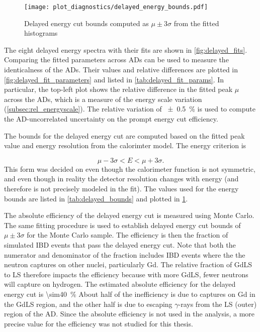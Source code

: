 \begin{figure}
    \centering
    \texttt{[image: plot\_diagnostics/delayed\_energy\_bounds.pdf]}
    \caption{
        Delayed energy cut bounds computed as $\mu\pm 3\sigma$
        from the fitted histograms
    }
    \label{fig:delayed_bounds}
\end{figure}

The eight delayed energy spectra with their fits are shown in \cref{fig:delayed_fits}.
Comparing the fitted parameters across ADs can be used
to measure the identicalness of the ADs.
Their values and relative differences are plotted in \cref{fig:delayed_fit_parameters}
and listed in \cref{tab:delayed_fit_params}.
In particular, the top-left plot shows the relative difference
in the fitted peak $\mu$ across the ADs,
which is a measure of the energy scale variation (\cref{subsec:rel_energyscale}).
The relative variation of \SI{+-0.5}{\percent}
is used to compute the AD-uncorrelated uncertainty
on the prompt energy cut efficiency.

The bounds for the delayed energy cut are computed
based on the fitted peak value and energy resolution
from the calorimter model. The energy criterion is

\begin{equation}
    \mu - 3\sigma < E < \mu + 3\sigma.
\end{equation}
This form was decided on even though the calorimeter function
is not symmetric, and even though in reality
the detector resolution changes with energy
(and therefore is not precisely modeled in the fit).
The values used for the energy bounds are listed in \cref{tab:delayed_bounds}
and plotted in \cref{fig:delayed_bounds}.

The absolute efficiency of the delayed energy cut
is measured using Monte Carlo.
The same fitting procedure is used to establish
delayed energy cut bounds of $\mu \pm 3\sigma$ for the Monte Carlo sample.
The efficiency is then the fraction of simulated IBD events
that pass the delayed energy cut.
Note that both the numerator and denominator of the fraction includes IBD events
where the the neutron captures on other nuclei, particularly Gd.
The relative fraction of GdLS to LS therefore impacts the efficiency
because with more GdLS, fewer neutrons will capture on hydrogen.
The estimated absolute efficiency for the delayed energy cut
is \SI{\sim40}{\percent}
About half of the inefficiency is due to captures on Gd in the GdLS region,
and the other half is due to escaping $\gamma$-rays
from the LS (outer) region of the AD.
Since the absolute efficiency is not used in the \thetaot{} analysis,
a more precise value for the efficiency was not studied for this thesis.

